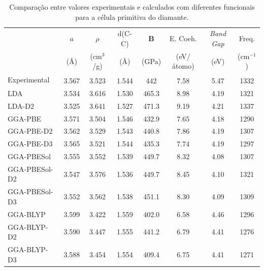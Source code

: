 		\begin{table}[]
			\centering
			\caption{Comparação entre valores experimentais e calculados com diferentes funcionais para a célula primitiva do diamante.}
			\label{dados_diamante}
			\renewcommand{\arraystretch}{1.2}
			\small\selectfont
			\begin{tabular}{l|ccccccc}
				\hline\hline
				& $a$ & $\rho$ & d(C-C) & \textbf{B} & E. Coeh. & \textit{Band Gap} & Freq. \\
				& (\AA{}) & (cm$^3$/g) & (\AA{}) & (GPa) & (eV/átomo) & (eV) & (cm$^{-1}$) \\ \hline
				Experimental & 3.567\textsuperscript{\cite{hom1975accurate}} & 3.523\textsuperscript{\cite{hom1975accurate}}     & 1.544\textsuperscript{\cite{hom1975accurate}}       & 442\textsuperscript{\cite{grimsditch1975brillouin}}     &  7.58\textsuperscript{\cite{greenwood2012chemistry}}     & 5.47\textsuperscript{\cite{greenwood2012chemistry}}     & 1332\textsuperscript{\cite{warren1967lattice}}         \\
				LDA          & 3.534 & 3.616     & 1.530        & 465.3   &  8.98     & 4.19     & 1321         \\
				LDA-D2       & 3.525 & 3.641     & 1.527        & 471.3   &  9.19     & 4.21     & 1337         \\
				GGA-PBE      & 3.571 & 3.504     & 1.546        & 432.9   &  7.65     & 4.18     & 1290         \\
				GGA-PBE-D2   & 3.562 & 3.529     & 1.543        & 440.8   &  7.86     & 4.19     & 1307         \\
				GGA-PBE-D3   & 3.565 & 3.521     & 1.544        & 435.3   &  7.74     & 4.19     & 1297         \\
				GGA-PBESol   & 3.555 & 3.552     & 1.539        & 449.7   &  8.32     & 4.08     & 1307         \\
				GGA-PBESol-D2& 3.547 & 3.576     & 1.536        & 449.7   &  8.45     & 4.10     & 1321         \\
				GGA-PBESol-D3& 3.552 & 3.562     & 1.538        & 451.1   &  8.30     & 4.09     & 1309         \\
				GGA-BLYP     & 3.599 & 3.422     & 1.559        & 402.0   &  6.58     & 4.46     & 1296         \\
				GGA-BLYP-D2  & 3.590 & 3.447     & 1.555        & 441.2   &  6.79     & 4.41     & 1276         \\
				GGA-BLYP-D3  & 3.588 & 3.454     & 1.554        & 409.4   &  6.75     & 4.41     & 1271         \\

\end{tabular}
\end{table}
